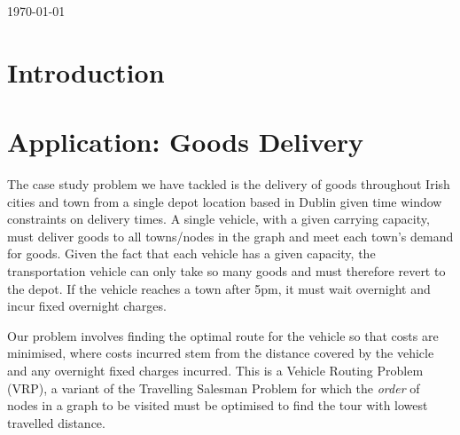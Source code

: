 \documentclass[a4paper,11pt]{article}
\begin{document}
\begin{titlepage}
{\large \today}\\[3cm] %


 

\vfill %

\end{titlepage}

\section{Introduction}


\section{Application: Goods Delivery}

The case study problem we have tackled is the delivery of goods throughout Irish cities and town from a single depot location based in Dublin given time window constraints on delivery times. A single vehicle, with a given carrying capacity, must deliver goods to all towns/nodes in the graph and meet each town's demand for goods. Given the fact that each vehicle has a given capacity, the transportation vehicle can only take so many goods and must therefore revert to the depot. If the vehicle reaches a town after 5pm, it must wait overnight and incur fixed overnight charges.

Our problem involves finding the optimal route for the vehicle so that costs are minimised, where costs incurred stem from the distance covered by the vehicle and any overnight fixed charges incurred. This is a Vehicle Routing Problem (VRP), a variant of the Travelling Salesman Problem for which the \textit{order} of nodes in a graph to be visited must be optimised to find the tour with lowest travelled distance. 
\end{document}
